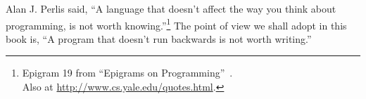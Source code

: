 








Alan J. Perlis said, ``A language that doesn't affect the way you think about programming, is not worth knowing.''\footnote{Epigram 19 from ``Epigrams on Programming''~\cite{Perlis:1982:SFE:947955.1083808}.\\Also at \url{http://www.cs.yale.edu/quotes.html}.}
%
The point of view we shall adopt in this book is, ``A program that doesn't run backwards is not worth writing.''







